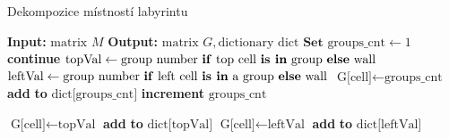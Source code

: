 \begin{algorithm}[hb]
\caption{Dekompozice místností labyrintu}\label{alg:labyrinth_decomposition}
\begin{algorithmic}[1]
\State \textbf{Input:} $\text{matrix } M$ \textcolor{cyan}{}
\State \textbf{Output:} $\text{matrix } G, \text{dictionary } \text{dict}$ \textcolor{cyan}{}
\vspace{0.2em}
\State $\textbf{Set } \text{groups\_cnt} \gets 1$ \textcolor{cyan}{}
\vspace{0.2em}
        \vspace{0.2em}
            \State \textbf{continue}
        \EndIf
        \Statex \textcolor{blue}{}
        \State $\text{topVal} \gets \text{group number \textbf{if} top cell \textbf{is in} group \textbf{else} } \text{wall}$
        \State $\text{leftVal} \gets \text{group number \textbf{if} left cell \textbf{is in} a group \textbf{else} } \text{wall}$
        \vspace{0.3em}
         \textcolor{blue}{}
            \State $\text{G[cell]} \gets \text{groups\_cnt}$
            \State \textbf{add}  \textbf{to} $\text{dict[groups\_cnt]}$
            \State \textbf{increment} $\text{groups\_cnt}$

        \vspace{0.3em}
         \textcolor{blue}{}
            \State $\text{G[cell]} \gets \text{topVal}$
            \State \textbf{add}  \textbf{to} $\text{dict[topVal]}$
        \vspace{0.3em} 
         \textcolor{blue}{}
            \State $\text{G[cell]} \gets \text{leftVal}$
            \State \textbf{add}  \textbf{to} $\text{dict[leftVal]}$
            

\end{algorithmic}
\end{algorithm}
